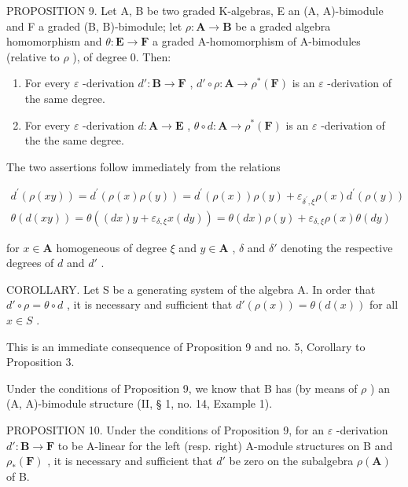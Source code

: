 PROPOSITION 9. Let A, B be two graded K-algebras, E an (A, A)-bimodule and F a graded (B, B)-bimodule; let \(\rho: \mathbf{A} \to \mathbf{B}\) be a graded algebra homomorphism and \(\theta: \mathbf{E} \to \mathbf{F}\) a graded A-homomorphism of A-bimodules (relative to \(\rho\) ), of degree 0. Then:

\begin{enumerate}
\def\labelenumi{(\roman{enumi})}
\item
  For every \(\varepsilon\) -derivation \(d':\mathbf{B}\to\mathbf{F}\) , \(d'\circ\rho:\mathbf{A}\to\rho^{*}(\mathbf{F})\) is an \(\varepsilon\) -derivation of the same degree.
\item
  For every \(\varepsilon\) -derivation \(d: \mathbf{A} \to \mathbf{E}\) , \(\theta \circ d: \mathbf{A} \to \rho^{*}(\mathbf{F})\) is an \(\varepsilon\) -derivation of the the same degree.
\end{enumerate}

The two assertions follow immediately from the relations

\[
\begin{array}{l} d ^ {\prime} (\rho (x y)) = d ^ {\prime} (\rho (x) \rho (y)) = d ^ {\prime} (\rho (x)) \rho (y) + \varepsilon_ {\delta ^ {\prime}, \xi} \rho (x) d ^ {\prime} (\rho (y)) \\ \theta (d (x y)) = \theta ((d x) y + \varepsilon_ {\delta, \xi} x (d y)) = \theta (d x) \rho (y) + \varepsilon_ {\delta, \xi} \rho (x) \theta (d y) \end{array}
\]

for \(x \in \mathbf{A}\) homogeneous of degree \(\xi\) and \(y \in \mathbf{A}\) , \(\delta\) and \(\delta'\) denoting the respective degrees of \(d\) and \(d'\) .

COROLLARY. Let S be a generating system of the algebra A. In order that \(d' \circ \rho = \theta \circ d\) , it is necessary and sufficient that \(d'(\rho(x)) = \theta(d(x))\) for all \(x \in S\) .

This is an immediate consequence of Proposition 9 and no. 5, Corollary to Proposition 3.

Under the conditions of Proposition 9, we know that B has (by means of \(\rho\) ) an (A, A)-bimodule structure (II, § 1, no. 14, Example 1).

PROPOSITION 10. Under the conditions of Proposition 9, for an \(\varepsilon\) -derivation \(d': \mathbf{B} \to \mathbf{F}\) to be A-linear for the left (resp. right) A-module structures on B and \(\rho_*(\mathbf{F})\) , it is necessary and sufficient that \(d'\) be zero on the subalgebra \(\rho(\mathbf{A})\) of B.

